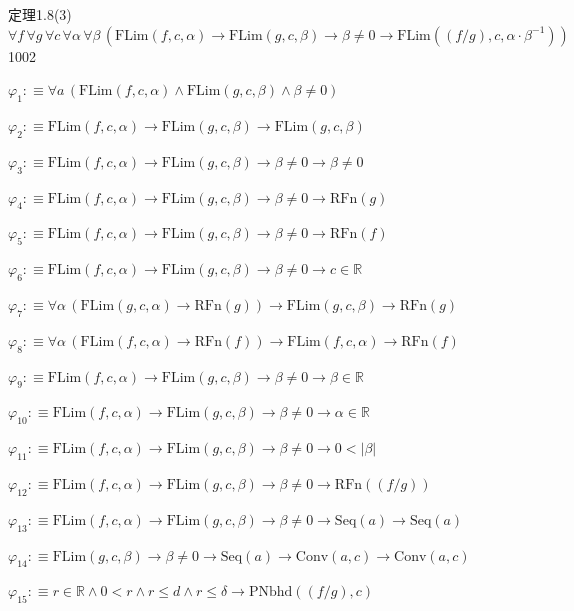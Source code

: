 \begin{fullproof}{定理1.8(3)}{$\forall f\,\forall g\,\forall c\,\forall \alpha\,\forall \beta\,(\mathrm{FLim}(f,c,\alpha) \to \mathrm{FLim}(g,c,\beta) \to \beta \neq 0 \to \mathrm{FLim}((f / g),c,\alpha \cdot \beta^{-1}))$}{1002}
\begin{ptree}
\end{ptree}
\begin{abbrevlist}
\item $\varphi_{1} :\equiv \forall a\,(\mathrm{FLim}(f,c,\alpha) \land \mathrm{FLim}(g,c,\beta) \land \beta \neq 0)$
\item $\varphi_{2} :\equiv \mathrm{FLim}(f,c,\alpha) \to \mathrm{FLim}(g,c,\beta) \to \mathrm{FLim}(g,c,\beta)$
\item $\varphi_{3} :\equiv \mathrm{FLim}(f,c,\alpha) \to \mathrm{FLim}(g,c,\beta) \to \beta \neq 0 \to \beta \neq 0$
\item $\varphi_{4} :\equiv \mathrm{FLim}(f,c,\alpha) \to \mathrm{FLim}(g,c,\beta) \to \beta \neq 0 \to \mathrm{RFn}(g)$
\item $\varphi_{5} :\equiv \mathrm{FLim}(f,c,\alpha) \to \mathrm{FLim}(g,c,\beta) \to \beta \neq 0 \to \mathrm{RFn}(f)$
\item $\varphi_{6} :\equiv \mathrm{FLim}(f,c,\alpha) \to \mathrm{FLim}(g,c,\beta) \to \beta \neq 0 \to c \in \mathbb{R}$
\item $\varphi_{7} :\equiv \forall \alpha\,(\mathrm{FLim}(g,c,\alpha) \to \mathrm{RFn}(g)) \to \mathrm{FLim}(g,c,\beta) \to \mathrm{RFn}(g)$
\item $\varphi_{8} :\equiv \forall \alpha\,(\mathrm{FLim}(f,c,\alpha) \to \mathrm{RFn}(f)) \to \mathrm{FLim}(f,c,\alpha) \to \mathrm{RFn}(f)$
\item $\varphi_{9} :\equiv \mathrm{FLim}(f,c,\alpha) \to \mathrm{FLim}(g,c,\beta) \to \beta \neq 0 \to \beta \in \mathbb{R}$
\item $\varphi_{10} :\equiv \mathrm{FLim}(f,c,\alpha) \to \mathrm{FLim}(g,c,\beta) \to \beta \neq 0 \to \alpha \in \mathbb{R}$
\item $\varphi_{11} :\equiv \mathrm{FLim}(f,c,\alpha) \to \mathrm{FLim}(g,c,\beta) \to \beta \neq 0 \to 0 < \lvert \beta \rvert$
\item $\varphi_{12} :\equiv \mathrm{FLim}(f,c,\alpha) \to \mathrm{FLim}(g,c,\beta) \to \beta \neq 0 \to \mathrm{RFn}((f / g))$
\item $\varphi_{13} :\equiv \mathrm{FLim}(f,c,\alpha) \to \mathrm{FLim}(g,c,\beta) \to \beta \neq 0 \to \mathrm{Seq}(a) \to \mathrm{Seq}(a)$
\item $\varphi_{14} :\equiv \mathrm{FLim}(g,c,\beta) \to \beta \neq 0 \to \mathrm{Seq}(a) \to \mathrm{Conv}(a,c) \to \mathrm{Conv}(a,c)$
\item $\varphi_{15} :\equiv r \in \mathbb{R} \land 0 < r \land r \leq d \land r \leq \delta \to \mathrm{PNbhd}((f / g),c)$

\end{abbrevlist}
\end{fullproof}
